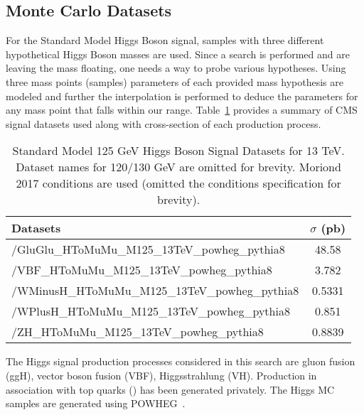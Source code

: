 \subsection{Monte Carlo Datasets}
For the Standard Model Higgs Boson signal, samples with three different hypothetical Higgs Boson masses are used. Since a search is performed and are leaving the mass floating, one needs a way to probe various hypotheses. Using three mass points (samples) parameters of each provided mass hypothesis are modeled and further the interpolation is performed to deduce the parameters for any mass point that falls within our range. Table~\ref{table:higgs_data_signaldatasets} provides a summary of CMS signal datasets used along with cross-section of each production process.
\begin{table}[htb]
    \caption{Standard Model 125 GeV Higgs Boson Signal Datasets for 13 TeV. Dataset names for 120/130 GeV are omitted for brevity. Moriond 2017 conditions are used (omitted the conditions specification for brevity).}
    \label{table:higgs_data_signaldatasets}
    \begin{center}
        \begin{tabular}{ l  c}
            \hline
            Datasets & $\sigma$ (pb)\\
            \hline
            {/GluGlu\_HToMuMu\_M125\_13TeV\_powheg\_pythia8} & 48.58\\
            {/VBF\_HToMuMu\_M125\_13TeV\_powheg\_pythia8} & 3.782\\
            {/WMinusH\_HToMuMu\_M125\_13TeV\_powheg\_pythia8} & 0.5331\\
            {/WPlusH\_HToMuMu\_M125\_13TeV\_powheg\_pythia8} & 0.851\\
            {/ZH\_HToMuMu\_M125\_13TeV\_powheg\_pythia8} & 0.8839 \\
            \hline
        \end{tabular}
    \end{center}
\end{table}
The Higgs signal production processes considered in this search are gluon
fusion (ggH), vector boson fusion (VBF), Higgsstrahlung (VH). Production in
association with top quarks (\ttH) has been generated privately. The Higgs MC samples are generated using {\sc POWHEG}~\cite{Nason:2004rx}.
